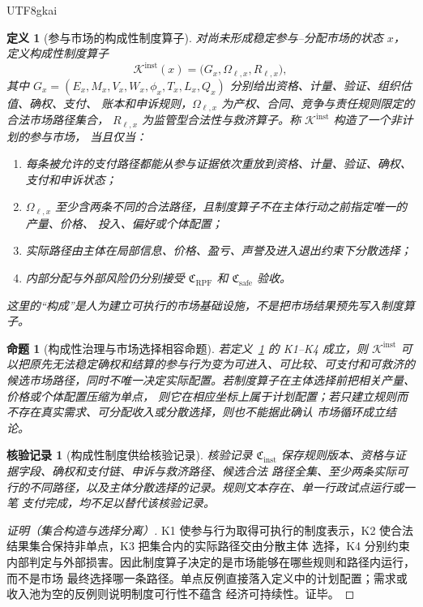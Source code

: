 \documentclass[12pt,a4paper,openany]{report}
\newtheorem{definition}{定义}[chapter]
\newtheorem{proposition}{命题}[chapter]
\newtheorem{Certificate}{核验记录}[chapter]
\begin{document}
\begin{CJK*}{UTF8}{gkai}
\begin{definition}[参与市场的构成性制度算子]
\label{def:constitutive-institution-operator}
对尚未形成稳定参与--分配市场的状态 \(x\)，定义构成性制度算子
\[
  \mathcal K^{\mathrm{inst}}(x)
  =\bigl(G_x,\Omega_{\ell,x},R_{\ell,x}\bigr),
\]
其中 \(G_x=(E_x,M_x,V_x,W_x,\phi_x,T_x,L_x,Q_x)\) 分别给出资格、计量、验证、组织估值、确权、支付、
账本和申诉规则，\(\Omega_{\ell,x}\) 为产权、合同、竞争与责任规则限定的合法市场路径集合，
\(R_{\ell,x}\) 为监管型合法性与救济算子。称 \(\mathcal K^{\mathrm{inst}}\) 构造了一个非计划的参与市场，
当且仅当：
\begin{enumerate}[label=\textnormal{K\arabic*:},leftmargin=3.5em]
  \item 每条被允许的支付路径都能从参与证据依次重放到资格、计量、验证、确权、支付和申诉状态；
  \item \(\Omega_{\ell,x}\) 至少含两条不同的合法路径，且制度算子不在主体行动之前指定唯一的产量、价格、
  投入、偏好或个体配置；
  \item 实际路径由主体在局部信息、价格、盈亏、声誉及进入退出约束下分散选择；
  \item 内部分配与外部风险仍分别接受 \(\mathfrak C_{\mathrm{RPF}}\) 和 \(\mathfrak C_{\mathrm{safe}}\) 验收。
\end{enumerate}
这里的“构成”是人为建立可执行的市场基础设施，不是把市场结果预先写入制度算子。
\end{definition}

\begin{proposition}[构成性治理与市场选择相容命题]
\label{prop:constitutive-governance-market-compatible}
若定义~\ref{def:constitutive-institution-operator} 的 K1--K4 成立，则
\(\mathcal K^{\mathrm{inst}}\) 可以把原先无法稳定确权和结算的参与行为变为可进入、可比较、可支付和可救济的
候选市场路径，同时不唯一决定实际配置。若制度算子在主体选择前把相关产量、价格或个体配置压缩为单点，
则它在相应坐标上属于计划配置；若只建立规则而不存在真实需求、可分配收入或分散选择，则也不能据此确认
市场循环成立结论。
\end{proposition}

\begin{Certificate}[构成性制度供给核验记录]
\label{cert:constitutive-institution}
核验记录 \(\mathfrak C_{\mathrm{inst}}\) 保存规则版本、资格与证据字段、确权和支付链、申诉与救济路径、候选合法
路径全集、至少两条实际可行的不同路径，以及主体分散选择的记录。规则文本存在、单一行政试点运行或一笔
支付完成，均不足以替代该核验记录。
\end{Certificate}

\begin{proof}[证明（集合构造与选择分离）]
K1 使参与行为取得可执行的制度表示，K2 使合法结果集合保持非单点，K3 把集合内的实际路径交由分散主体
选择，K4 分别约束内部判定与外部损害。因此制度算子决定的是市场能够在哪些规则和路径内运行，而不是市场
最终选择哪一条路径。单点反例直接落入定义中的计划配置；需求或收入池为空的反例则说明制度可行性不蕴含
经济可持续性。证毕。
\end{proof}


\end{CJK*}
\end{document}

